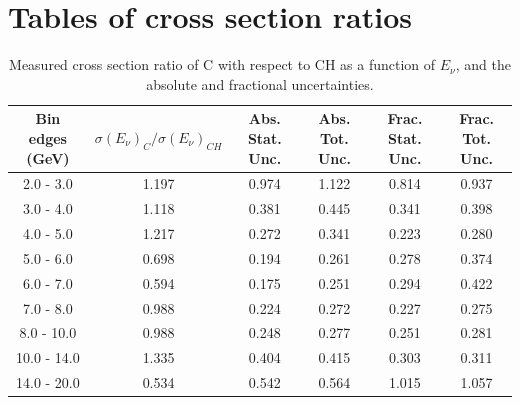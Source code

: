 \documentclass[aps,prl,twocolumn,superscriptaddress,nofootinbib]{revtex4-1}
\begin{document}
\clearpage
\pagebreak[4]


\section{Tables of cross section ratios}
\label{section:xsecRatiosTables}

\begin{table}[h!]
  \centering
  \caption{Measured cross section ratio of C with respect to CH as a function
  of $E_{\nu}$,  and the absolute and fractional uncertainties.}
    \begin{tabular}{c||c||c|c||c|c}
      Bin edges (GeV) & $\sigma(E_{\nu})_{C}/\sigma(E_{\nu})_{CH}$ & Abs. Stat. Unc. & Abs. Tot. Unc. & Frac. Stat. Unc. & Frac. Tot. Unc. \\
      \hline\hline
        2.0 - 3.0 & 1.197 & 0.974 & 1.122 & 0.814 & 0.937 \\
        3.0 - 4.0 & 1.118 & 0.381 & 0.445 & 0.341 & 0.398 \\
        4.0 - 5.0 & 1.217 & 0.272 & 0.341 & 0.223 & 0.280 \\
        5.0 - 6.0 & 0.698 & 0.194 & 0.261 & 0.278 & 0.374 \\
        6.0 - 7.0 & 0.594 & 0.175 & 0.251 & 0.294 & 0.422 \\
        7.0 - 8.0 & 0.988 & 0.224 & 0.272 & 0.227 & 0.275 \\
       8.0 - 10.0 & 0.988 & 0.248 & 0.277 & 0.251 & 0.281 \\
      10.0 - 14.0 & 1.335 & 0.404 & 0.415 & 0.303 & 0.311 \\
      14.0 - 20.0 & 0.534 & 0.542 & 0.564 & 1.015 & 1.057 \\
    \end{tabular}
  \label{table:EnuXSecRatio_C}
\end{table}
\end{document}
